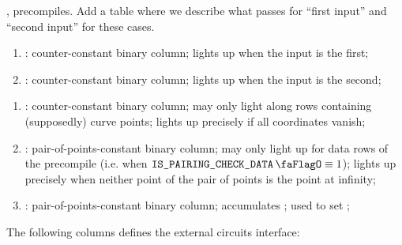 ,
precompiles.
\specTodo{} Add a table where we describe what passes for ``first input'' and ``second input'' for these cases.
\begin{enumerate}[resume]
    \item
        \isFirstInput:
        counter-constant binary column;
        lights up when the input is the first;
    \item
        \isSecondInput:
        counter-constant binary column;
        lights up when the input is the second;
\end{enumerate}
\begin{enumerate}[resume]
    \item
        \isInfinity:
        counter-constant binary column;
        may only light along rows containing (supposedly) curve points;
        lights up precisely if all coordinates vanish;
    \item
        \both{\nontrivialPairOfPointsBit}:
        pair-of-points-constant binary column;
        may only light up for data rows of the  precompile (i.e. when $\isBlsPairingCheckData \equiv 1$);
        lights up precisely when neither point of the pair of points is the point at infinity;
    \item
        \both{\nontrivialPairOfPointsAcc}:
        pair-of-points-constant binary column;
        accumulates \nontrivialPairOfPointsBit{};
        used to set \wellformedDataNontrivial{};
\end{enumerate}
The following columns defines the external circuits interface:
